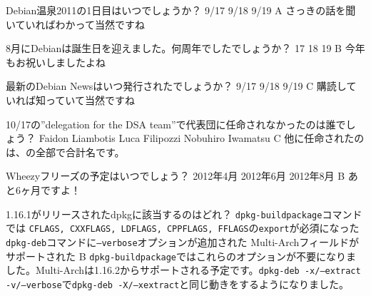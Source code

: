 %

\santaku
{Debian温泉2011の1日目はいつでしょうか？}
{9/17}
{9/18}
{9/19}
{A}
{さっきの話を聞いていればわかって当然ですね}

\santaku
{8月にDebianは誕生日を迎えました。何周年でしたでしょうか？}
{17}
{18}
{19}
{B}
{今年もお祝いしましたよね}

\santaku
{最新のDebian Newsはいつ発行されたでしょうか？}
{9/17}
{9/18}
{9/19}
{C}
{購読していれば知っていて当然ですね}

\santaku
{10/17の''delegation for the DSA team''で代表団に任命されなかったのは誰でしょう？}
{Faidon Liambotis}
{Luca Filipozzi}
{Nobuhiro Iwamatsu}
{C}
{他に任命されたのは、の全部で合計名です。}

\santaku
{Wheezyフリーズの予定はいつでしょう？}
{2012年4月}
{2012年6月}
{2012年8月}
{B}
{あと6ヶ月ですよ！}

\santaku
{1.16.1がリリースされたdpkgに該当するのはどれ？}
{\texttt{dpkg-buildpackage}コマンドでは \texttt{CFLAGS, CXXFLAGS, LDFLAGS, CPPFLAGS, FFLAGS}の\texttt{export}が必須になった}
{\texttt{dpkg-deb}コマンドに\texttt{--verbose}オプションが追加された}
{Multi-Archフィールドがサポートされた}
{B}
{\texttt{dpkg-buildpackage}ではこれらのオプションが不要になりました。Multi-Archは1.16.2からサポートされる予定です。\texttt{dpkg-deb -x/--extract -v/--verbose}で\texttt{dpkg-deb -X/--xextract}と同じ動きをするようになりました。}
